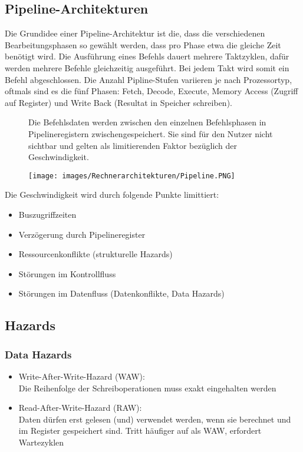 \subsection{Pipeline-Architekturen}
Die Grundidee einer Pipeline-Architektur ist die, dass die verschiedenen Bearbeitungsphasen so gewählt werden, dass pro Phase etwa die gleiche Zeit benötigt wird.
Die Ausführung eines Befehls dauert mehrere Taktzyklen, dafür werden mehrere Befehle gleichzeitig ausgeführt.
Bei jedem Takt wird somit ein Befehl abgeschlossen.
Die Anzahl Pipline-Stufen variieren je nach Prozessortyp, oftmals sind es die fünf Phasen: Fetch, Decode, Execute, Memory Access (Zugriff auf Register) und Write Back (Resultat in Speicher schreiben).
\begin{figure}[htbp]
	
	\begin{minipage}{0.5\textwidth}
		Die Befehlsdaten werden zwischen den einzelnen Befehlsphasen in Pipelineregistern zwischengespeichert. Sie sind für den Nutzer nicht sichtbar und gelten als limitierenden Faktor bezüglich der Geschwindigkeit.		
		
	\end{minipage}
	\hfill		
	\begin{minipage}{0.45\textwidth} 
		\texttt{[image: images/Rechnerarchitekturen/Pipeline.PNG]}
	\end{minipage}
	
\end{figure}
\vspace{-0.5cm}
\newline
Die Geschwindigkeit wird durch folgende Punkte limittiert:
\begin{itemize}[noitemsep,topsep=0pt]
	\item Buszugriffzeiten
	\item Verzögerung durch Pipelineregister
	\item Ressourcenkonflikte (strukturelle Hazards)
	\item Störungen im Kontrollfluss
	\item Störungen im Datenfluss (Datenkonflikte, Data Hazards)
\end{itemize}

\subsection{Hazards}
\subsubsection{Data Hazards}
\begin{itemize}[noitemsep,topsep=0pt]
	\item Write-After-Write-Hazard (WAW):\\
	Die Reihenfolge der Schreiboperationen muss exakt eingehalten werden
	\item Read-After-Write-Hazard (RAW):\\
	Daten dürfen erst gelesen (und) verwendet werden, wenn sie berechnet und im Register gespeichert sind. Tritt häufiger auf als WAW, erfordert Wartezyklen
\end{itemize}

